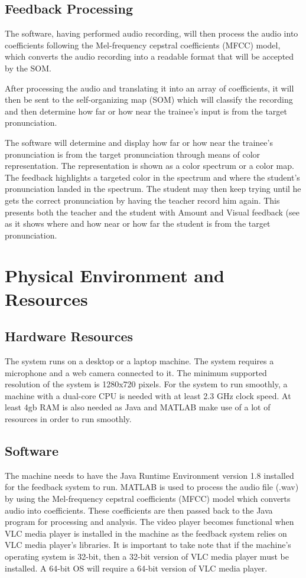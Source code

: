 \subsection{Feedback Processing}
The software, having performed audio recording, will then process the audio into coefficients following the Mel-frequency cepstral coefficients (MFCC) model, which converts the audio recording into a readable format that will be accepted by the SOM.

After processing the audio and translating it into an array of coefficients, it will then be sent to the self-organizing map (SOM) which will classify the recording and then determine how far or how near the trainee's input is from the target pronunciation.

The software will determine and display how far or how near the trainee's pronunciation is from the target pronunciation through means of color representation. The representation is shown as a color spectrum or a color map. The feedback highlights a targeted color in the spectrum and where the student's pronunciation landed in the spectrum. The student may then keep trying until he gets the correct pronunciation by having the teacher record him again. This presents both the teacher and the student with Amount and Visual feedback (see  as it shows where and how near or how far the student is from the target pronunciation.

\section{Physical Environment and Resources}

\subsection{Hardware Resources}
The system runs on a desktop or a laptop machine. The system requires a microphone and a web camera connected to it. The minimum supported resolution of the system is 1280x720 pixels. For the system to run smoothly, a machine with a dual-core CPU is needed with at least 2.3 GHz clock speed. At least 4gb RAM is also needed as Java and MATLAB make use of a lot of resources in order to run smoothly.

\subsection{Software}
The machine needs to have the Java Runtime Environment version 1.8 installed for the feedback system to run.
MATLAB is used to process the audio file (.wav) by using the Mel-frequency cepstral coefficients (MFCC) model which converts audio into coefficients. These coefficients are then passed back to the Java program for processing and analysis.
The video player becomes functional when VLC media player is installed in the machine as the feedback system relies on VLC media player's libraries. It is important to take note that if the machine's operating system is 32-bit, then a 32-bit version of VLC media player must be installed. A 64-bit OS will require a 64-bit version of VLC media player.
